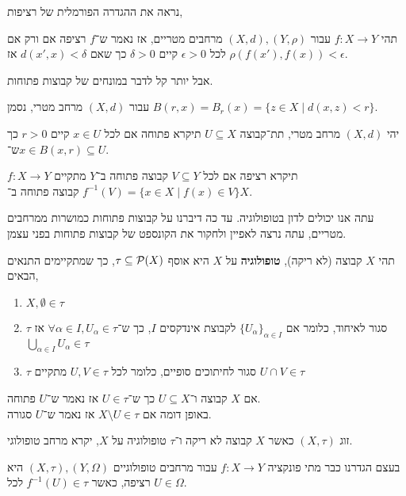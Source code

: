 נראה את ההגדרה הפורמלית של רציפות,
\begin{definition}[רציפות]\label{function_continuous_definition}
	תהי $f : X \to Y$ עבור $(X, d), (Y, \rho)$ מרחבים מטריים, אז נאמר ש־$f$ רציפה אם ורק אם לכל $\epsilon > 0$ קיים $\delta > 0$ כך שאם $d(x', x) < \delta$ אז $\rho(f(x'), f(x)) < \epsilon$.
\end{definition}
אבל יותר קל לדבר במונחים של קבוצות פתוחות.
\begin{definition}[כדור]
	עבור $(X, d)$ מרחב מטרי,
	נסמן $B(r, x) = B_r(x) = \{ z \in X \mid d(x, z) < r \}$.
\end{definition}
\begin{definition}
	יהי $(X, d)$ מרחב מטרי, תת־קבוצה $U \subseteq X$ תיקרא פתוחה אם לכל $x \in U$ קיים $r > 0$ כך ש־$x \in B(x, r) \subseteq U$.
\end{definition}
\begin{definition}
	$f : X \to Y$ תיקרא רציפה אם לכל $V \subseteq Y$ קבוצה פתוחה ב־$Y$ מתקיים $f^{-1}(V) = \{ x \in X \mid f(x) \in V \}$ קבוצה פתוחה ב־$X$.
\end{definition}
עתה אנו יכולים לדון בטופולוגיה.
עד כה דיברנו על קבוצות פתוחות כמושרות ממרחבים מטריים, עתה נרצה לאפיין ולחקור את הקונספט של קבוצות פתוחות בפני עצמן.
\begin{definition}[טופולוגיה]
	תהי $X$ קבוצה (לא ריקה), \textbf{טופולוגיה} על $X$ היא אוסף $\tau \subseteq \mathcal{P}(X)$, כך שמתקיימים התנאים הבאים,
	\begin{enumerate}
		\item $X, \emptyset \in \tau$
		\item $\tau$ סגור לאיחוד, כלומר אם ${\{U_\alpha\}}_{\alpha \in I}$ לקבוצת אינדקסים $I$, כך ש־$\forall \alpha \in I, U_\alpha \in \tau$ אז $\bigcup_{\alpha \in I} U_\alpha \in \tau$
		\item $\tau$ סגור לחיתוכים סופיים, כלומר לכל $U, V \in \tau$ מתקיים $U \cap V \in \tau$
	\end{enumerate}
\end{definition}
\begin{remark}
	אם $X$ קבוצה ו־$U \subseteq X$ כך ש־$U \in \tau$ אז נאמר ש־$U$ פתוחה. \\
	באופן דומה אם $X \setminus U \in \tau$ אז נאמר ש־$U$ סגורה.
\end{remark}
\begin{definition}
	זוג $(X, \tau)$ כאשר $X$ קבוצה לא ריקה ו־$\tau$ טופולוגיה על $X$, יקרא מרחב טופולוגי.
\end{definition}
\begin{remark}
	בעצם הגדרנו כבר מתי פונקציה $f : X \to Y$ עבור מרחבים טופולוגיים $(X, \tau), (Y, \Omega)$ היא רציפה, כאשר $f^{-1}(U) \in \tau$ לכל $U \in \Omega$.
\end{remark}
